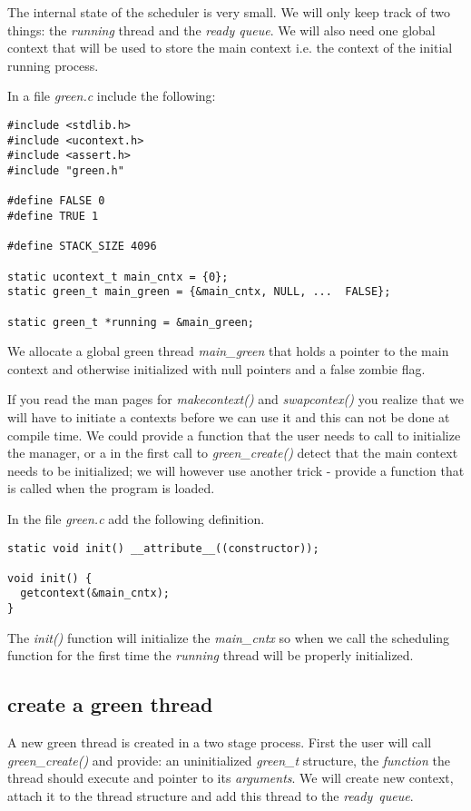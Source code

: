 \documentclass[a4paper,11pt]{article}
\begin{document}
The internal state of the scheduler is very small. We will only keep
track of two things: the {\em running} thread and the {\em ready
queue}. We will also need one global context that will be used to store
the main context i.e. the context of the initial running process.

In a file {\em green.c} include the following:

\begin{lstlisting}
#include <stdlib.h>
#include <ucontext.h>
#include <assert.h>
#include "green.h"

#define FALSE 0
#define TRUE 1

#define STACK_SIZE 4096

static ucontext_t main_cntx = {0};
static green_t main_green = {&main_cntx, NULL, ...  FALSE};

static green_t *running = &main_green;
\end{lstlisting}

We allocate a global green thread {\em main\_green} that holds a
pointer to the main context and otherwise initialized with null
pointers and a false zombie flag.

If you read the man pages for {\em makecontext()} and {\em
  swapcontex()} you realize that we will have to initiate a contexts
before we can use it and this can not be done at compile time. We
could provide a function that the user needs to call to initialize the
manager, or a in the first call to {\em green\_create()} detect that
the main context needs to be initialized; we will however use another
trick - provide a function that is called when the program is loaded.

In the file {\em green.c} add the following definition. 

\begin{lstlisting}
static void init() __attribute__((constructor));

void init() {
  getcontext(&main_cntx);
}
\end{lstlisting}

The {\em init()} function will initialize the {\em main\_cntx} so when
we call the scheduling function for the first time the {\em running}
thread will be properly initialized.

\subsection{create a green thread}

A new green thread is created in a two stage process. First the user
will call {\em green\_create()} and provide: an uninitialized {\em
  green\_t} structure, the {\em function} the thread should execute and
pointer to its {\em arguments}. We will create new context, attach it
to the thread structure and add this thread to the {\em ready\ queue}.
\end{document}
